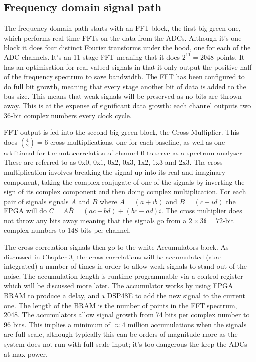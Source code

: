 \subsection{Frequency domain signal path}
The frequency domain path starts with an FFT block, the first big green one,  which performs real time FFTs on the data from the ADCs. Although it's one block it does four distinct Fourier transforms under the hood, one for each of the ADC channels. It's an 11 stage FFT meaning that it does \(2^{11} = 2048\) points. It has an optimisation for real-valued signals in that it only output the positive half of the frequency spectrum to save bandwidth. The FFT has been configured to do full bit growth, meaning that every stage another bit of data is added to the bus size. This means that weak signals will be preserved as no bits are thrown away. This is at the expense of significant data growth: each channel outputs two 36-bit complex numbers every clock cycle.

FFT output is fed into the second big green block, the Cross Multiplier. This does \({4 \choose 2} = 6\) cross multiplications, one for each baseline, as well as one additional for the autocorrelation of channel 0 to serve as a spectrum analyser. These are referred to as 0x0, 0x1, 0x2, 0x3, 1x2, 1x3 and 2x3. The cross multiplication involves breaking the signal up into its real and imaginary component, taking the complex conjugate of one of the signals by inverting the sign of its complex component and then doing complex multiplication. For each pair of signals signals \(A\) and \(B\) where \(A = (a + ib)\) and \(B = (c + id)\) the FPGA will do \(C = A\overline{B} = (ac + bd) + (bc - ad)i\). The cross multiplier does not throw any bits away meaning that the signals go from a \(2 \times 36 = 72\)-bit complex numbers to 148 bits per channel.

The cross correlation signals then go to the white Accumulators block. As discussed in Chapter 3, the cross correlations will be accumulated (aka: integrated) a number of times in order to allow weak signals to stand out of the noise. The accumulation length is runtime programmable via a control register which will be discussed more later. The accumulator works by using FPGA BRAM to produce a delay, and a DSP48E to add the new signal to the current one. The length of the BRAM is the number of points in the FFT spectrum, 2048. The accumulators allow signal growth from 74 bits per complex number to 96 bits. This implies a minimum of \(\approx 4\) million accumulations when the signals are full scale, although typically this can be orders of magnitude more as the system does not run with full scale input; it's too dangerous the keep the ADCs at max power.

